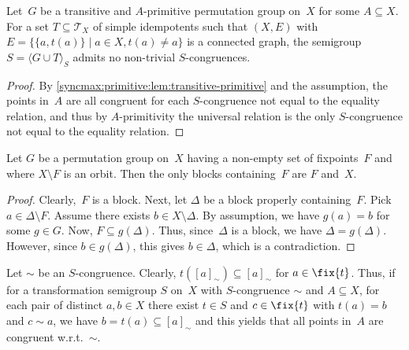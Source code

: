 \begin{corollary}
	Let~$G$ be a transitive and $A$-primitive permutation group on~$X$
	for some $A \subseteq X$.
	For a set $T \subseteq \mathcal T_X$
	of simple idempotents
	such that $(X, E)$ with $E = \{ \{a, t(a)\} \mid a \in X, t(a) \ne a \}$
	is a connected graph,
	the semigroup $S = \langle G \cup T \rangle_S$
	admits no non-trivial $S$-congruences.
\end{corollary}
\begin{proof}
	By \cref{syncmax:primitive:lem:transitive-primitive}
	and the assumption, the points in~$A$
	are all congruent for each $S$-congruence
	not equal to the equality relation,
	and thus by $A$-primitivity
	the universal relation is the only
	$S$-congruence not equal to the equality relation.	
\end{proof}

\begin{lemma}
	Let $G$ be a permutation group on~$X$
	having a non-empty set of fixpoints~$F$
	and where $X \setminus F$ is an orbit.
	Then the only blocks containing~$F$
	are $F$ and~$X$.		
\end{lemma}
\begin{proof}
	Clearly,~$F$ is a block.
	Next, let $\Delta$
	be a block properly containing~$F$.
	Pick $a \in \Delta \setminus F$.
	Assume there exists $b \in X \setminus \Delta$.
	By assumption, we have $g(a) = b$
	for some $g \in G$.
	Now, $F \subseteq g(\Delta)$.
	Thus, since~$\Delta$
	is a block, we have $\Delta = g(\Delta)$.
	However, since $b \in g(\Delta)$, this gives $b \in \Delta$,
	which is a contradiction.
\end{proof}

Let $\sim$ be an $S$-congruence.
Clearly, $t( [a]_{\sim} ) \subseteq [a]_{\sim}$ for $a \in \fix{t}$.
Thus, if for a transformation semigroup $S$ on~$X$ with $S$-congruence $\sim$
and $A \subseteq X$, for each pair of distinct $a,b \in X$
there exist $t \in S$ and $c \in \fix{t}$ with $t(a) = b$ and $c \sim a$,
we have %
$b = t(a) \subseteq [a]_{\sim}$
and this yields that all points in~$A$ are congruent w.r.t.~$\sim$.

